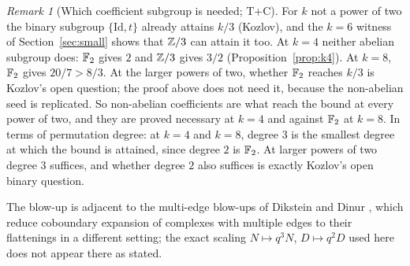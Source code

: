 \documentclass[11pt]{article}
\theoremstyle{remark}\newtheorem{remark}[theorem]{Remark}
\newcommand{\Id}{\mathrm{Id}}\newcommand{\Tr}{\operatorname{Tr}}
\begin{document}
\begin{remark}[Which coefficient subgroup is needed; T+C]
For $k$ not a power of two the binary subgroup $\{\Id,t\}$ already attains $k/3$ (Kozlov), and the $k=6$ witness of Section~\ref{sec:small} shows that $\mathbb{Z}/3$ can attain it too. At $k=4$ neither abelian subgroup does: $\mathbb{F}_2$ gives $2$ and $\mathbb{Z}/3$ gives $3/2$ (Proposition~\ref{prop:k4}). At $k=8$, $\mathbb{F}_2$ gives $20/7>8/3$. At the larger powers of two, whether $\mathbb{F}_2$ reaches $k/3$ is Kozlov's open question; the proof above does not need it, because the non-abelian seed is replicated. So non-abelian coefficients are what reach the bound at every power of two, and they are proved necessary at $k=4$ and against $\mathbb{F}_2$ at $k=8$. In terms of permutation degree: at $k=4$ and $k=8$, degree $3$ is the smallest degree at which the bound is attained, since degree $2$ is $\mathbb{F}_2$. At larger powers of two degree $3$ suffices, and whether degree $2$ also suffices is exactly Kozlov's open binary question.
\end{remark}

 The blow-up is adjacent to the multi-edge blow-ups of Dikstein and Dinur \cite{DD}, which reduce coboundary expansion of complexes with multiple edges to their flattenings in a different setting; the exact scaling $N\mapsto q^3N$, $D\mapsto q^2D$ used here does not appear there as stated.
\end{document}
